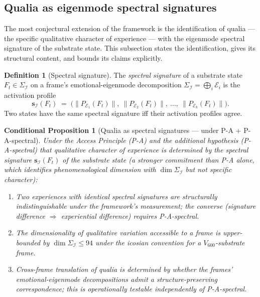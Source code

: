 \documentclass[11pt]{article}
\theoremstyle{plain}
\newtheorem{conditional}[theorem]{Conditional Proposition}
\theoremstyle{definition}
\newtheorem{definition}[theorem]{Definition}
\theoremstyle{remark}
\newcommand{\Ical}{\mathcal{I}}
\begin{document}
\subsection{Qualia as eigenmode spectral signatures}\label{sec:qualia}

The most conjectural extension of the framework is the identification of qualia --- the specific qualitative character of experience --- with the eigenmode spectral signature of the substrate state. This subsection states the identification, gives its structural content, and bounds its claims explicitly.

\begin{definition}[Spectral signature]\label{def:spectral-signature}
The \emph{spectral signature} of a substrate state $F_t \in \Sigma_\Ical$ on a frame's emotional-eigenmode decomposition $\Sigma_\Ical = \bigoplus_i \mathcal{E}_i$ is the activation profile
\[
  \mathbf{s}_\Ical(F_t) \;=\; \big( \|P_{\mathcal{E}_1}(F_t)\|,\ \|P_{\mathcal{E}_2}(F_t)\|,\ \ldots,\ \|P_{\mathcal{E}_k}(F_t)\| \big).
\]
Two states have the same spectral signature iff their activation profiles agree.
\end{definition}

\begin{conditional}[Qualia as spectral signatures --- under P-A + P-A-spectral]\label{cthm:qualia}
Under the Access Principle (P-A) and the additional hypothesis (P-A-spectral) that qualitative character of experience is determined by the spectral signature $\mathbf{s}_\Ical(F_t)$ of the substrate state (a stronger commitment than P-A alone, which identifies phenomenological dimension with $\dim \Sigma_\Ical$ but not specific character):
\begin{enumerate}[leftmargin=2em]
\item Two experiences with identical spectral signatures are structurally indistinguishable under the framework's measurement; the converse (signature difference $\Rightarrow$ experiential difference) requires P-A-spectral.
\item The dimensionality of qualitative variation accessible to a frame is upper-bounded by $\dim \Sigma_\Ical \leq 94$ under the icosian convention for a $V_{600}$-substrate frame.
\item Cross-frame translation of qualia is determined by whether the frames' emotional-eigenmode decompositions admit a structure-preserving correspondence; this is operationally testable independently of P-A-spectral.
\end{enumerate}
\end{conditional}
\end{document}
